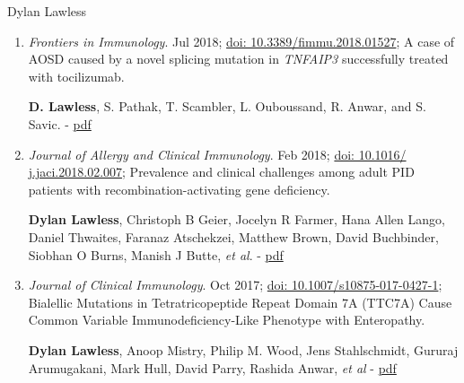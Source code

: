 \documentclass[12pt,a4paper]{article}
\begin{document}
\begin{cv}{Dylan Lawless}
\begin{enumerate}
\textbf{Dylan Lawless}, Hana Lango Allen, James Thaventhiran, NIHR BioResource–Rare Diseases Consortium, Flavia Hodel, Rashida Anwar, Jacques Fellay, Jolan E. Walter, Sinisa Savic.
- \href{https://dylanlawless.github.io/resume/pdf/2019JOCILawless_Predicting_the_Occurrence_of_Variants_in_RAG1_and_RAG2.pdf}{pdf}

\item \emph{Frontiers in Immunology}. Jul 2018;
\href{https://doi.org/10.3389/fimmu.2018.01527}{doi: 10.3389/fimmu.2018.01527};
A case of AOSD caused by a novel splicing mutation in \textit{TNFAIP3} successfully treated with tocilizumab.

\textbf{D. Lawless}, S. Pathak, T. Scambler, L. Ouboussand, R. Anwar, and S. Savic.
- \href{https://dylanlawless.github.io/resume/pdf/2018FrontImmLawless_A\%20Case\%20of\%20Adult-Onset\%20Still’s\%20Disease\%20Caused\%20by\%20a\%20Novel\%20Splicing\%20Mutation\%20in\%20TNFAIP3\%20Successfully\%20Treated\%20With\%20Tocilizumab.pdf}{pdf}

\item \emph{Journal of Allergy and Clinical Immunology}. Feb 2018; 
\href{https://doi.org/10.1016/j.jaci.2018.02.007}{doi: 10.1016/ j.jaci.2018.02.007};
Prevalence and clinical challenges among adult PID patients with recombination-activating gene deficiency.

\textbf{Dylan Lawless}, Christoph B Geier, Jocelyn R Farmer, Hana Allen Lango, Daniel Thwaites, Faranaz Atschekzei, Matthew Brown, David Buchbinder, Siobhan O Burns, Manish J Butte,  \textit{et al}.
- \href{https://dylanlawless.github.io/resume/pdf/2018JACILawless_Prevalence\%20and\%20clinical\%20challenges\%20among\%20adults\%20with\%20primary\%20immunodeficiency\%20and\%20recombination-activating\%20gene\%20deficiency.Letter.pdf}{pdf}

\item \emph{Journal of Clinical Immunology}. Oct 2017; 
\href{https://doi.org/10.1007/s10875-017-0427-1}{doi: 10.1007/s10875-017-0427-1};
Bialellic Mutations in Tetratricopeptide Repeat Domain 7A (TTC7A) Cause Common Variable Immunodeficiency-Like Phenotype with Enteropathy.

\textbf{Dylan Lawless}, Anoop Mistry, Philip M. Wood, Jens Stahlschmidt, Gururaj Arumugakani, Mark Hull, David Parry, Rashida Anwar, \textit{et al}
- \href{https://dylanlawless.github.io/resume/pdf/2017JOCILawless_Bialellic\%20Mutations\%20in\%20Tetratricopeptide\%20Repeat\%20Domain\%207A\%20(TTC7A)\%20Cause\%20Common\%20Variable\%20Immunodeficiency-Like\%20Phenotype\%20with\%20Enteropathy\%2010.1007_s10875-017-0427-1.pdf}{pdf}


\end{enumerate}
\end{cv}
\end{document}

